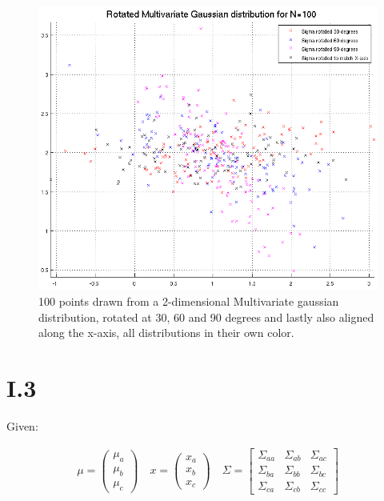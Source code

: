 \begin{figure}[h!]
	\includegraphics[width=\textwidth]{img/multigaussrotate}
	\caption{100 points drawn from a 2-dimensional Multivariate gaussian
          distribution, rotated at 30, 60 and 90 degrees and lastly also aligned
          along the x-axis, all distributions in their own
          color. \label{fig:I.2.4.1.rot}}
\end{figure}

\FloatBarrier
\pagebreak
\section*{I.3}

Given:

\begin{align*}
	\mu = \begin{pmatrix}
		\mu_a \\
		\mu_b \\
		\mu_c
	\end{pmatrix} \quad
	x = \begin{pmatrix}
		x_a \\
		x_b \\
		x_c
	\end{pmatrix} \quad
	\Sigma = \begin{bmatrix}
		\Sigma_{aa} & \Sigma_{ab} & \Sigma_{ac} \\
		\Sigma_{ba} & \Sigma_{bb} & \Sigma_{bc} \\
		\Sigma_{ca} & \Sigma_{cb} & \Sigma_{cc}
	\end{bmatrix}
\end{align*}

